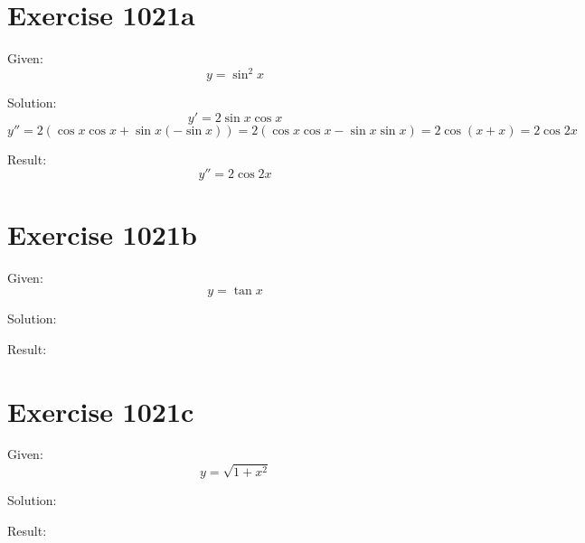 \documentclass[a4paper, 10pt]{scrartcl}
\begin{document}
\section{Exercise 1021a}

Given:
\[
y = \sin^{2}{x}
\]

Solution:
\[
y' = 2\sin{x}\cos{x}
\]
\[
y'' = 2(\cos{x}\cos{x} + \sin{x}(-\sin{x})) = 2(\cos{x}\cos{x} - \sin{x}\sin{x}) = 2\cos{(x + x)} = 2\cos{2x}
\]

Result:
\[
y'' = 2\cos{2x}
\]

\section{Exercise 1021b}

Given:
\[
y = \tan{x}
\]

Solution:

Result:

\section{Exercise 1021c}

Given:
\[
y = \sqrt{1 + x^{2}}
\]

Solution:

Result:
\end{document}

